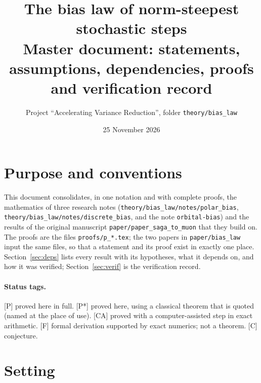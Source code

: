 \documentclass[10pt]{article}
\title{\vspace{-2em}The bias law of norm-steepest stochastic steps\\[2pt]
\large Master document: statements, assumptions, dependencies, proofs and verification record}
\author{Project ``Accelerating Variance Reduction'', folder \texttt{theory/bias\_law}}
\date{25 November 2026}
\theoremstyle{definition}
\theoremstyle{remark}
\newcommand{\status}[1]{\textsf{\small[#1]}}
\begin{document}
\maketitle
\tableofcontents

\section{Purpose and conventions}

This document consolidates, in one notation and with complete proofs, the mathematics of three research notes
(\texttt{theory/bias\_law/notes/polar\_bias}, \texttt{theory/bias\_law/notes/discrete\_bias}, and the note \texttt{orbital-bias}) and the
results of the original manuscript \texttt{paper/paper\_saga\_to\_muon} that they build on. The proofs are the files
\texttt{proofs/p\_*.tex}; the two papers in \texttt{paper/bias\_law} input the same files, so that a statement and its proof
exist in exactly one place. Section~\ref{sec:deps} lists every result with its hypotheses, what it depends on, and how
it was verified; Section~\ref{sec:verif} is the verification record.

\paragraph{Status tags.} \status{P} proved here in full. \status{P*} proved here, using a classical theorem that is quoted
(named at the place of use). \status{CA} proved with a computer-assisted step in exact arithmetic. \status{F} formal
derivation supported by exact numerics; not a theorem. \status{C} conjecture.

\section{Setting}\label{sec:setting}
\end{document}
